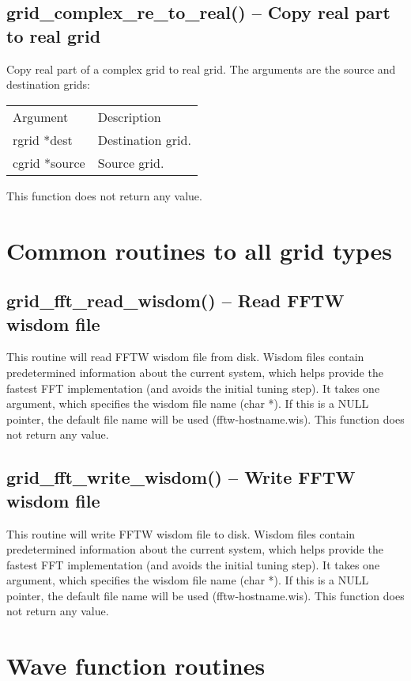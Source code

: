 \documentclass[12pt,letterpaper]{report}
\begin{document}
\subsection{grid\_complex\_re\_to\_real() -- Copy real part to real grid}

Copy real part of a complex grid to real grid. The arguments are the source and destination grids:
\begin{longtable}{p{} p{}}
Argument & Description\\
\cline{1-2}
rgrid *dest & Destination grid.\\
cgrid *source & Source grid.\\
\end{longtable}
\noindent
This function does not return any value.

\section{Common routines to all grid types}

\subsection{grid\_fft\_read\_wisdom() -- Read FFTW wisdom file}

This routine will read FFTW wisdom file from disk. Wisdom files contain predetermined information about the current system, which helps provide the fastest FFT implementation (and avoids the initial tuning step). It takes one argument, which specifies the wisdom file name (char *). If this is a NULL pointer, the default file name will be used (fftw-hostname.wis). This function does not return any value.

\subsection{grid\_fft\_write\_wisdom() -- Write FFTW wisdom file}

This routine will write FFTW wisdom file to disk. Wisdom files contain predetermined information about the current system, which helps provide the fastest FFT implementation (and avoids the initial tuning step).  It takes one argument, which specifies the wisdom file name (char *). If this is a NULL pointer, the default file name will be used (fftw-hostname.wis). This function does not return any value.

\section{Wave function routines}
\end{document}
